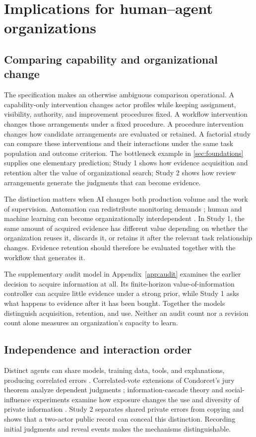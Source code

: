 \section{Implications for human--agent organizations}
\subsection{Comparing capability and organizational change}
The specification makes an otherwise ambiguous comparison operational. A capability-only intervention changes actor profiles while keeping assignment, visibility, authority, and improvement procedures fixed. A workflow intervention changes those arrangements under a fixed procedure. A procedure intervention changes how candidate arrangements are evaluated or retained. A factorial study can compare these interventions and their interactions under the same task population and outcome criterion. The bottleneck example in \cref{sec:foundations} supplies one elementary prediction; Study 1 shows how evidence acquisition and retention alter the value of organizational search; Study 2 shows how review arrangements generate the judgments that can become evidence.

The distinction matters when AI changes both production volume and the work of supervision. Automation can redistribute monitoring demands \citep{bainbridge}; human and machine learning can become organizationally interdependent \citep{sturm}. In Study 1, the same amount of acquired evidence has different value depending on whether the organization reuses it, discards it, or retains it after the relevant task relationship changes. Evidence retention should therefore be evaluated together with the workflow that generates it.

The supplementary audit model in Appendix~\ref{app:audit} examines the earlier decision to acquire information at all. Its finite-horizon value-of-information controller can acquire little evidence under a strong prior, while Study 1 asks what happens to evidence after it has been bought. Together the models distinguish acquisition, retention, and use. Neither an audit count nor a revision count alone measures an organization's capacity to learn.

\subsection{Independence and interaction order}
Distinct agents can share models, training data, tools, and explanations, producing correlated errors \citep{clemen}. Correlated-vote extensions of Condorcet's jury theorem analyze dependent judgments \citep{ladha1992}; information-cascade theory and social-influence experiments examine how exposure changes the use and diversity of private information \citep{bikhchandani1992,lorenz}. Study 2 separates shared private errors from copying and shows that a two-actor public record can conceal this distinction. Recording initial judgments and reveal events makes the mechanisms distinguishable.

